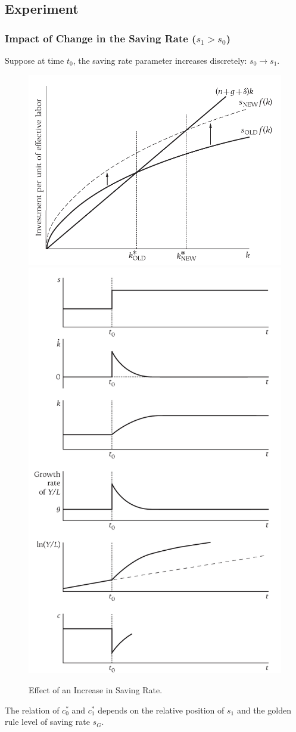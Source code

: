 \documentclass[]{article}
\begin{document}
		\subsection{Experiment}
			\subsubsection{Impact of Change in the Saving Rate ($s_1 > s_0$)}
			\par Suppose at time $t_0$, the saving rate parameter increases discretely: $s_0 \rightarrow s_1$.
			\begin{figure}[H]
				\centering
				\includegraphics[width=0.5\linewidth]{figures/3_3.png}
				\includegraphics[width=0.5\linewidth]{figures/3_4.png}
				\caption{Effect of an Increase in Saving Rate.}
			\end{figure}
			
			\begin{remark}
				The relation of $c_0^*$ and $c_1^*$ depends on the relative position of $s_1$ and the golden rule level of saving rate $s_G$.
			\end{remark}
			
\end{document}
